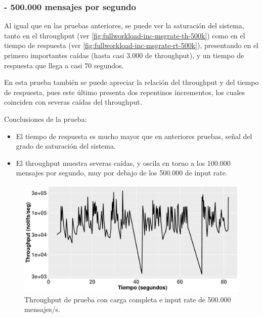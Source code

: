 
\subsubsection*{- 500.000 mensajes por segundo}

Al igual que en las pruebas anteriores, se puede ver la saturación del sistema,
tanto en el throughput (ver \autoref{fig:fullworkload-inc-msgrate-th-500k})
como en el tiempo de respuesta (ver \autoref{fig:fullworkload-inc-msgrate-rt-500k}),
presentando en el primero importantes caídas (hasta casi 3.000 de throughput),
y un tiempo de respuesta que llega a casi 70 segundos. 

En esta prueba también se puede apreciar la relación del throughput y del
tiempo de respuesta, pues este último presenta dos repentinos incrementos, los cuales
coinciden con severas caídas del throughput.

Conclusiones de la prueba:
\begin{itemize}
    \item El tiempo de respuesta es mucho mayor que en anteriores pruebas, señal
    del grado de saturación del sistema.
    \item El throughput muestra severas caídas, y oscila en torno a los 100.000
    mensajes por segundo, muy por debajo de los 500.000 de input rate.
\end{itemize}

\begin{figure}[htpb]
    \centering
    \includegraphics[width=\textwidth]{images/full-worklad-inc-msgrate/th_full-workload-inc-msgrate_500k.pdf}
    \caption{Throughput de prueba con carga completa e input rate de 500.000 mensajes/s.}
    \label{fig:fullworkload-inc-msgrate-th-500k}
\end{figure}

